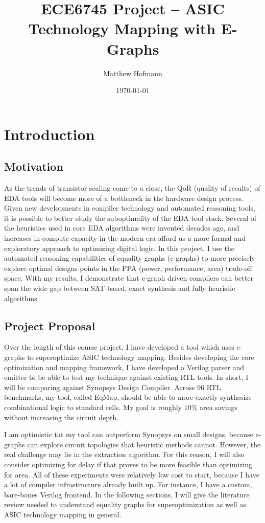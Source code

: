 \documentclass[10pt,letterpaper]{article}
\title{ECE6745 Project -- ASIC Technology Mapping with E-Graphs}
\author{Matthew Hofmann}
\date{\today}
\newcommand{\shortname}{EqMap}
\begin{document}
\maketitle


\section{Introduction}\label{sec:intro}
\subsection{Motivation}\label{sec:intro:motivation}

As the trends of transistor scaling come to a close, the QoR (quality of
results) of EDA tools will become more of a bottleneck in the hardware design
process. Given new developments in compiler technology and automated reasoning
tools, it is possible to better study the suboptimality of the EDA tool stack.
Several of the heuristics used in core EDA algorithms were invented decades
ago, and increases in compute capacity in the modern era afford us a more
formal and exploratory approach to optimizing digital logic. In this project, I
use the automated reasoning capabilities of equality graphs (e-graphs) to more
precisely explore optimal designs points in the PPA (power, performance, area)
trade-off space. With my results, I demonstrate that e-graph driven compilers
can better span the wide gap between SAT-based, exact synthesis and fully
heuristic algorithms.

\subsection{Project Proposal}\label{sec:intro:proposal}

Over the length of this course project, I have developed a tool which uses
e-graphs to superoptimize ASIC technology mapping. Besides developing the core
optimization and mapping framework, I have developed a Verilog parser and
emitter to be able to test my technique against existing RTL tools. In short, I
will be comparing against Synopsys Design Compiler. Across 96 RTL benchmarks,
my tool, called \shortname{}, should be able to more exactly synthesize
combinational logic to standard cells. My goal is roughly 10\% area savings
without increasing the circuit depth.

I am optimistic tat my tool can outperform Synopsys on small designs, because
e-graphs can explore circuit topologies that heuristic methods cannot. However,
the real challenge may lie in the extraction algorithm. For this reason, I will
also consider optimizing for delay if that proves to be more feasible than
optimizing for area. All of these experiments were relatively low cost to
start, because I have a lot of compiler infrastructure already built up. For
instance, I have a custom, bare-bones Verilog frontend. In the following
sections, I will give the literature review needed to understand equality
graphs for superoptimization as well as ASIC technology mapping in general.
\end{document}

